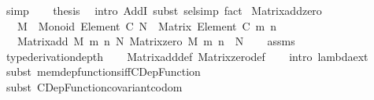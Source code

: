 \begin{isabellebody}
\ simp\isanewline
\ \ \isamarkupfalse%
\ {\isacharquery}{\kern0pt}thesis\ \isamarkupfalse%
\ {\isacharparenleft}{\kern0pt}intro\ AddI{\isacharcomma}{\kern0pt}\ subst\ sel{\isacharunderscore}{\kern0pt}simp{\isacharparenright}{\kern0pt}\ fact\isanewline
{}\isamarkupfalse%
%
\endisatagproof
{\isafoldproof}%
%
\isadelimproof
%
\endisadelimproof
%
\isadelimdocument
%
\endisadelimdocument
%
\isatagdocument
%
\isamarkuptrue%
%
\endisatagdocument
{\isafolddocument}%
%
\isadelimdocument
%
\endisadelimdocument
{}\isamarkupfalse%
\ Matrix{\isacharunderscore}{\kern0pt}add{\isacharunderscore}{\kern0pt}zero{\isacharcolon}{\kern0pt}\isanewline
\ \ \ {\isachardoublequoteopen}M\ {\isacharcolon}{\kern0pt}\ Monoid\ {\isacharparenleft}{\kern0pt}Element\ C{\isacharparenright}{\kern0pt}{\isachardoublequoteclose}\ {\isachardoublequoteopen}N\ {\isacharcolon}{\kern0pt}\ Matrix\ {\isacharparenleft}{\kern0pt}Element\ C{\isacharparenright}{\kern0pt}\ m\ n{\isachardoublequoteclose}\isanewline
\ \ \ {\isachardoublequoteopen}Matrix{\isacharunderscore}{\kern0pt}add\ M\ m\ n\ N\ {\isacharparenleft}{\kern0pt}Matrix{\isacharunderscore}{\kern0pt}zero\ M\ m\ n{\isacharparenright}{\kern0pt}\ {\isacharequal}{\kern0pt}\ N{\isachardoublequoteclose}\isanewline
%
\isadelimproof
\ \ %
\endisadelimproof
%
\isatagproof
{}\isamarkupfalse%
\ assms\ \isamarkupfalse%
\ {\isacharbrackleft}{\kern0pt}{\isacharbrackleft}{\kern0pt}type{\isacharunderscore}{\kern0pt}derivation{\isacharunderscore}{\kern0pt}depth{\isacharequal}{\kern0pt}{}{\isacharbrackright}{\kern0pt}{\isacharbrackright}{\kern0pt}\isanewline
\ \ \isamarkupfalse%
\ Matrix{\isacharunderscore}{\kern0pt}add{\isacharunderscore}{\kern0pt}def\ Matrix{\isacharunderscore}{\kern0pt}zero{\isacharunderscore}{\kern0pt}def\isanewline
\ \ \isamarkupfalse%
\ {\isacharparenleft}{\kern0pt}intro\ lambda{\isacharunderscore}{\kern0pt}ext{\isacharparenright}{\kern0pt}\isanewline
\ \ \isamarkupfalse%
\ {\isacharparenleft}{\kern0pt}subst\ mem{\isacharunderscore}{\kern0pt}dep{\isacharunderscore}{\kern0pt}functions{\isacharunderscore}{\kern0pt}iff{\isacharunderscore}{\kern0pt}CDep{\isacharunderscore}{\kern0pt}Function{\isacharparenright}{\kern0pt}\isanewline
\ \ \isamarkupfalse%
\ {\isacharparenleft}{\kern0pt}subst\ CDep{\isacharunderscore}{\kern0pt}Function{\isacharunderscore}{\kern0pt}covariant{\isacharunderscore}{\kern0pt}codom{\isacharparenright}{\kern0pt}\isanewline

\end{isabellebody}
